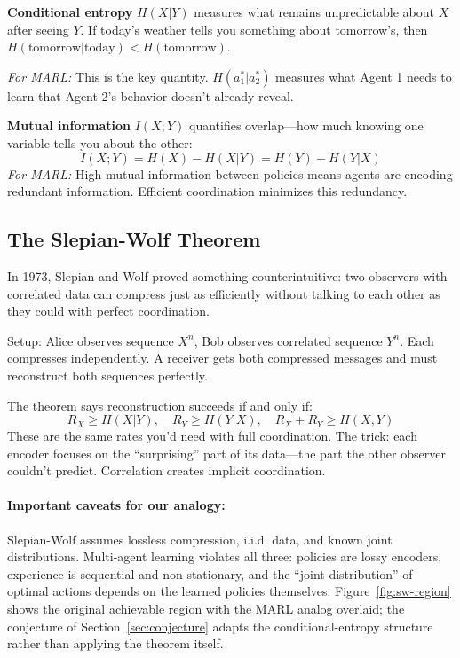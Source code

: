 \documentclass[10pt, letterpaper]{article}
\begin{document}
\textbf{Conditional entropy} $H(X|Y)$ measures what remains unpredictable about $X$ after seeing $Y$. If today's weather tells you something about tomorrow's, then $H(\text{tomorrow}|\text{today}) < H(\text{tomorrow})$.

\emph{For MARL:} This is the key quantity. $H(a_1^*|a_2^*)$ measures what Agent 1 needs to learn that Agent 2's behavior doesn't already reveal.

\textbf{Mutual information} $I(X;Y)$ quantifies overlap---how much knowing one variable tells you about the other:
\[I(X;Y) = H(X) - H(X|Y) = H(Y) - H(Y|X)\]
\emph{For MARL:} High mutual information between policies means agents are encoding redundant information. Efficient coordination minimizes this redundancy.

\subsection{The Slepian-Wolf Theorem}

In 1973, Slepian and Wolf proved something counterintuitive: two observers with correlated data can compress just as efficiently without talking to each other as they could with perfect coordination.

Setup: Alice observes sequence $X^n$, Bob observes correlated sequence $Y^n$. Each compresses independently. A receiver gets both compressed messages and must reconstruct both sequences perfectly.

The theorem says reconstruction succeeds if and only if:
\[R_X \geq H(X|Y), \quad R_Y \geq H(Y|X), \quad R_X + R_Y \geq H(X,Y)\]
These are the same rates you'd need with full coordination. The trick: each encoder focuses on the ``surprising'' part of its data---the part the other observer couldn't predict. Correlation creates implicit coordination.

\paragraph{Important caveats for our analogy:} Slepian-Wolf assumes lossless compression, i.i.d. data, and known joint distributions. Multi-agent learning violates all three: policies are lossy encoders, experience is sequential and non-stationary, and the ``joint distribution'' of optimal actions depends on the learned policies themselves. Figure~\ref{fig:sw-region} shows the original achievable region with the MARL analog overlaid; the conjecture of Section~\ref{sec:conjecture} adapts the conditional-entropy structure rather than applying the theorem itself.
\end{document}
